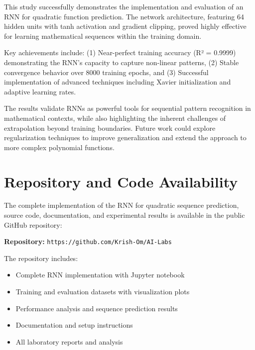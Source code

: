 \documentclass[11pt,a4paper]{article}
\begin{document}
This study successfully demonstrates the implementation and evaluation of an RNN for quadratic function prediction. The network architecture, featuring 64 hidden units with tanh activation and gradient clipping, proved highly effective for learning mathematical sequences within the training domain.

Key achievements include: (1) Near-perfect training accuracy (R² = 0.9999) demonstrating the RNN's capacity to capture non-linear patterns, (2) Stable convergence behavior over 8000 training epochs, and (3) Successful implementation of advanced techniques including Xavier initialization and adaptive learning rates.

The results validate RNNs as powerful tools for sequential pattern recognition in mathematical contexts, while also highlighting the inherent challenges of extrapolation beyond training boundaries. Future work could explore regularization techniques to improve generalization and extend the approach to more complex polynomial functions.

\section{Repository and Code Availability}

The complete implementation of the RNN for quadratic sequence prediction, source code, documentation, and experimental results is available in the public GitHub repository:

\textbf{Repository:} \texttt{https://github.com/Krish-Om/AI-Labs}

The repository includes:
\begin{itemize}
\item Complete RNN implementation with Jupyter notebook
\item Training and evaluation datasets with visualization plots
\item Performance analysis and sequence prediction results
\item Documentation and setup instructions
\item All laboratory reports and analysis
\end{itemize}
\end{document}
